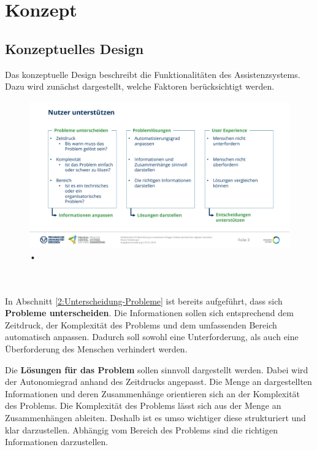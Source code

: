\chapter{Konzept}
\label{sec:Konzept}

\section{Konzeptuelles Design}
Das konzeptuelle Design beschreibt die Funktionalitäten des Assistenzsystems. Dazu wird zunächst dargestellt, welche Faktoren berücksichtigt werden.
\begin{figure}[htbp]
\centering
\includegraphics[scale=0.45]{DA_files/Bilder/Konzept/Nutzer-unterstuetzen.pdf}
\caption{•}
\label{pic:Nutzer-Unterstuetzen}
\end{figure}
\\ \\
In Abschnitt \ref{2:Unterscheidung-Probleme} ist bereits aufgeführt, dass sich \textbf{Probleme unterscheiden}. Die Informationen sollen sich entsprechend dem Zeitdruck, der Komplexität des Problems und dem umfassenden Bereich automatisch anpassen. Dadurch soll sowohl eine Unterforderung, als auch eine Überforderung des Menschen verhindert werden.

Die \textbf{Lösungen für das Problem} sollen sinnvoll dargestellt werden. Dabei wird der Autonomiegrad anhand des Zeitdrucks angepasst. Die Menge an dargestellten Informationen und deren Zusammenhänge orientieren sich an der Komplexität des Problems. Die Komplexität des Problems lässt sich aus der Menge an Zusammenhängen ableiten. Deshalb ist es umso wichtiger diese strukturiert und klar darzustellen. Abhängig vom Bereich des Problems sind die richtigen Informationen darzustellen.

